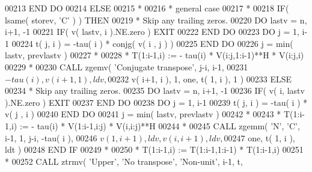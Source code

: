 \begin{DoxyCode}
00213 \textcolor{keywordflow}{               END DO}
00214             \textcolor{keywordflow}{ELSE}
00215 \textcolor{comment}{*}
00216 \textcolor{comment}{*              general case}
00217 \textcolor{comment}{*}
00218                \textcolor{keywordflow}{IF}( lsame( storev, \textcolor{stringliteral}{'C'} ) ) \textcolor{keywordflow}{THEN}
00219 \textcolor{comment}{*                 Skip any trailing zeros.}
00220                   \textcolor{keywordflow}{DO} lastv = n, i+1, -1
00221                      \textcolor{keywordflow}{IF}( v( lastv, i ).NE.zero ) \textcolor{keywordflow}{EXIT}
00222 \textcolor{keywordflow}{                  END DO}
00223                   \textcolor{keywordflow}{DO} j = 1, i-1
00224                      t( j, i ) = -tau( i ) * conjg( v( i , j ) )
00225 \textcolor{keywordflow}{                  END DO}                     
00226                   j = min( lastv, prevlastv )
00227 \textcolor{comment}{*}
00228 \textcolor{comment}{*                 T(1:i-1,i) := - tau(i) * V(i:j,1:i-1)**H * V(i:j,i)}
00229 \textcolor{comment}{*}
00230                   \textcolor{keyword}{CALL }zgemv( \textcolor{stringliteral}{'Conjugate transpose'}, j-i, i-1,
00231      $                        -tau( i ), v( i+1, 1 ), ldv, 
00232      $                        v( i+1, i ), 1, one, t( 1, i ), 1 )
00233                \textcolor{keywordflow}{ELSE}
00234 \textcolor{comment}{*                 Skip any trailing zeros.}
00235                   \textcolor{keywordflow}{DO} lastv = n, i+1, -1
00236                      \textcolor{keywordflow}{IF}( v( i, lastv ).NE.zero ) \textcolor{keywordflow}{EXIT}
00237 \textcolor{keywordflow}{                  END DO}
00238                   \textcolor{keywordflow}{DO} j = 1, i-1
00239                      t( j, i ) = -tau( i ) * v( j , i )
00240 \textcolor{keywordflow}{                  END DO}                     
00241                   j = min( lastv, prevlastv )
00242 \textcolor{comment}{*}
00243 \textcolor{comment}{*                 T(1:i-1,i) := - tau(i) * V(1:i-1,i:j) * V(i,i:j)**H}
00244 \textcolor{comment}{*}
00245                   \textcolor{keyword}{CALL }zgemm( \textcolor{stringliteral}{'N'}, \textcolor{stringliteral}{'C'}, i-1, 1, j-i, -tau( i ),
00246      $                        v( 1, i+1 ), ldv, v( i, i+1 ), ldv,
00247      $                        one, t( 1, i ), ldt )                  
00248 \textcolor{keywordflow}{               END IF}
00249 \textcolor{comment}{*}
00250 \textcolor{comment}{*              T(1:i-1,i) := T(1:i-1,1:i-1) * T(1:i-1,i)}
00251 \textcolor{comment}{*}
00252                \textcolor{keyword}{CALL }ztrmv( \textcolor{stringliteral}{'Upper'}, \textcolor{stringliteral}{'No transpose'}, \textcolor{stringliteral}{'Non-unit'}, i-1, t,

\end{DoxyCode}

